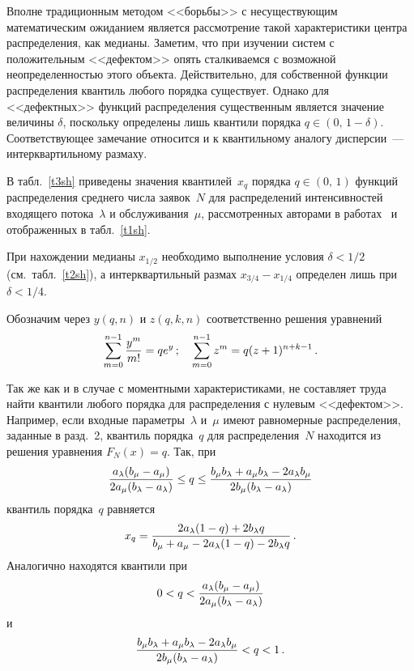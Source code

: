 \begin{multicols}{2}
Вполне традиционным методом <<борьбы>> с несуществующим математическим ожиданием является рассмотрение такой
характеристики центра распределения, как медианы. Заметим, что при изучении систем с положительным <<дефектом>> опять
сталкиваемся с возможной неопреде\-лен\-ностью этого объекта. Действительно, для собственной функции распределения
квантиль любого порядка существует. Однако для <<дефектных>> функций
распределения существенным является значение величины $\delta$, поскольку определены лишь квантили порядка 
$q\in(0,\,1-\delta)$. Соответствующее замечание относится и к квантильному аналогу дисперсии~--- интерквартильному 
размаху.

В табл.~\ref{t3sh} приведены значения квантилей~$x_q$ порядка $q\in(0,\, 1)$ функций распределения среднего числа
заявок~$N$ для распределений интенсивностей входящего потока~$\lambda$ и обслуживания~$\mu$, рассмотренных
авторами в работах~\cite{KuSh07, KuSh09a, KuSh09b} и отображенных в табл.~\ref{t1sh}.

При нахождении медианы $x_{1/2}$ необходимо выполнение условия $\delta<1/2$ (см.\ табл.~\ref{t2sh}), 
а интерквартильный размах
$x_{3/4}-x_{1/4}$ определен лишь при $\delta<1/4$.

Обозначим через $y(q,n)$ и $z(q,k,n)$ соответственно решения уравнений
\begin{equation}
\sum\limits_{m=0}^{n-1}\displaystyle\frac{\displaystyle y^m\mathstrut}{\displaystyle m!\mathstrut}=qe^y\,;\quad \sum\limits_{m=0}^{n-1}z^m=q(z+1)^{n+k-1}\,.
\label{e6sh}
\end{equation}

Так же как и в случае с моментными характеристиками, не составляет труда найти квантили любого порядка для распределения
с нулевым <<дефектом>>. Например, если входные параметры~$\lambda$ и~$\mu$ имеют равномерные распределения,
заданные в разд.~2, квантиль порядка~$q$ для распределения~$N$ находится из решения уравнения $F_N(x)=q$. Так, при
$$
\displaystyle\frac{\displaystyle a_\lambda(b_\mu-a_\mu)\mathstrut}{\displaystyle 2a_\mu(b_\lambda-a_\lambda)\mathstrut}\le q\le\displaystyle\frac{\displaystyle b_\mu b_\lambda+a_\mu b_\lambda-2a_\lambda
b_\mu\mathstrut}{\displaystyle 2b_\mu(b_\lambda-a_\lambda)\mathstrut}
$$
квантиль порядка~$q$ равняется
$$
x_q=\displaystyle\frac{\displaystyle 2a_\lambda(1-q)+2b_\lambda q\mathstrut}{\displaystyle b_\mu+a_\mu-2a_\lambda(1-q)-2b_\lambda q\mathstrut}\,.
$$
Аналогично находятся квантили при
$$
0<q<\displaystyle\frac{\displaystyle a_\lambda(b_\mu-a_\mu)\mathstrut}{\displaystyle 2a_\mu(b_\lambda-a_\lambda)\mathstrut}
$$
и
$$
\displaystyle\frac{\displaystyle b_\mu b_\lambda+a_\mu b_\lambda-2a_\lambda b_\mu\mathstrut}{\displaystyle 2b_\mu(b_\lambda-a_\lambda)\mathstrut}<q<1\,.
$$

{\small\frenchspacing
{%
\begin{thebibliography}{99}


\end{thebibliography}}}
\end{multicols}
